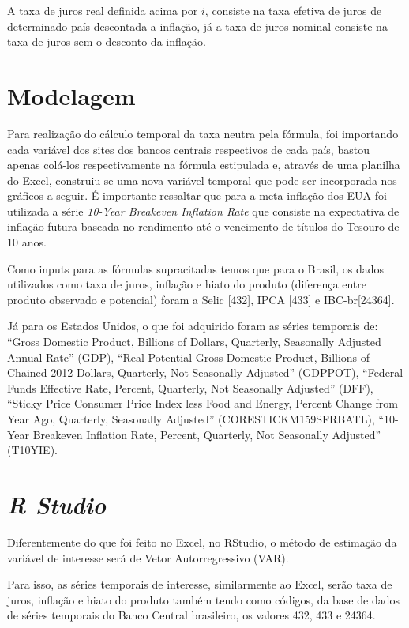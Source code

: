 A taxa de juros real definida acima por $i$, consiste na taxa efetiva de juros de determinado pa\'{i}s descontada a infla\c{c}\~{a}o, j\'{a} a taxa de juros nominal consiste na taxa de juros sem o desconto da infla\c{c}\~{a}o. 

\section*{Modelagem}

Para realiza\c{c}\~{a}o do c\'{a}lculo temporal da taxa neutra pela f\'{o}rmula, foi importando cada vari\'{a}vel dos sites dos bancos centrais respectivos de cada pa\'{i}s, bastou apenas col\'{a}-los respectivamente na f\'{o}rmula estipulada e, atrav\'{e}s de uma planilha do Excel, construiu-se uma nova vari\'{a}vel temporal que pode ser incorporada nos gr\'{a}ficos a seguir. \'{E} importante ressaltar que para a meta infla\c{c}\~{a}o dos EUA foi utilizada a s\'{e}rie \textit{10-Year Breakeven Inflation Rate }que consiste na expectativa de infla\c{c}\~{a}o futura baseada no rendimento at\'{e} o vencimento de t\'{i}tulos do Tesouro de 10 anos. \textbf{}

 Como inputs para as f\'{o}rmulas supracitadas temos que para o Brasil, os dados utilizados como taxa de juros, infla\c{c}\~{a}o e hiato do produto (diferen\c{c}a entre produto observado e potencial) foram a Selic [432], IPCA [433] e IBC-br[24364]. 

 J\'{a} para os Estados Unidos, o que foi adquirido foram as s\'{e}ries temporais de: ``Gross Domestic Product, Billions of Dollars, Quarterly, Seasonally Adjusted Annual Rate'' (GDP), ``Real Potential Gross Domestic Product, Billions of Chained 2012 Dollars, Quarterly, Not Seasonally Adjusted'' (GDPPOT), ``Federal Funds Effective Rate, Percent, Quarterly, Not Seasonally Adjusted'' (DFF), ``Sticky Price Consumer Price Index less Food and Energy, Percent Change from Year Ago, Quarterly, Seasonally Adjusted'' (CORESTICKM159SFRBATL), ``10-Year Breakeven Inflation Rate, Percent, Quarterly, Not Seasonally Adjusted'' (T10YIE). 

\section*{\textit{R Studio}}

 Diferentemente do que foi feito no Excel, no RStudio, o m\'{e}todo de estima\c{c}\~{a}o da vari\'{a}vel de interesse ser\'{a} de Vetor Autorregressivo (VAR).

 Para isso, as s\'{e}ries temporais de interesse, similarmente ao Excel, ser\~{a}o taxa de juros, infla\c{c}\~{a}o e hiato do produto tamb\'{e}m tendo como c\'{o}digos, da base de dados de s\'{e}ries temporais do Banco Central brasileiro, os valores 432, 433 e 24364. 

